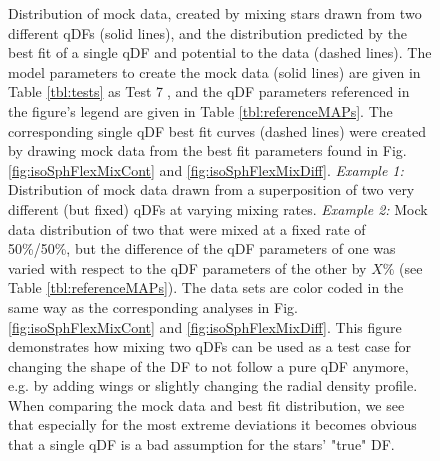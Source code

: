 \begin{figure}
\caption{Distribution of mock data, created by mixing stars drawn from two different qDFs (solid lines), and the distribution predicted by the best fit of a single qDF and potential to the data (dashed lines). The model parameters to create the mock data (solid lines) are given in Table \ref{tbl:tests} as Test \textcircled{7}, and the qDF parameters referenced in the figure's legend are given in Table \ref{tbl:referenceMAPs}. The corresponding single qDF best fit curves (dashed lines) were created by drawing mock data from the best fit parameters found in Fig. \ref{fig:isoSphFlexMixCont} and \ref{fig:isoSphFlexMixDiff}. \emph{Example 1:} Distribution of mock data drawn from a superposition of two very different (but fixed) qDFs at varying mixing rates. \emph{Example 2:} Mock data distribution of two \MAPs that were mixed at a fixed rate of 50\%/50\%, but the difference of the qDF parameters of one \MAP was varied with respect to the qDF parameters of the other \MAP by $X\%$ (see Table \ref{tbl:referenceMAPs}). The data sets are color coded in the same way as the corresponding analyses in Fig.  \ref{fig:isoSphFlexMixCont} and \ref{fig:isoSphFlexMixDiff}. This figure demonstrates how mixing two qDFs can be used as a test case for changing the shape of the DF to not follow a pure qDF anymore, e.g. by adding wings or slightly changing the radial density profile. When comparing the mock data and best fit distribution, we see that especially for the most extreme deviations it becomes obvious that a single qDF is a bad assumption for the stars' "true" DF.}
\label{fig:isoSphFlexMix_mockdata_residuals}
\end{figure}



